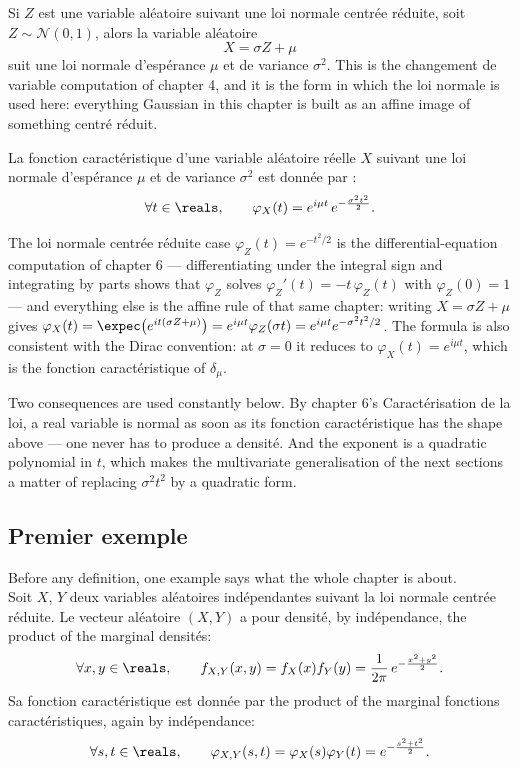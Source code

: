 Si $Z$ est une variable aléatoire suivant une loi normale centrée réduite, soit
$Z \sim \mathcal{N}(0,1)$, alors la variable aléatoire
\[
  X = \sigma Z + \mu
\]
suit une loi normale d'espérance $\mu$ et de variance $\sigma^{2}$. This
is the changement de variable computation of chapter 4, and it is the form in
which the loi normale is used here: everything Gaussian in this chapter is
built as an affine image of something centré réduit.

\begin{prop}
La fonction caractéristique d'une variable aléatoire réelle $X$ suivant une loi
normale d'espérance $\mu$ et de variance $\sigma^{2}$ est donnée par :
\[
  \forall t \in \reals, \qquad
  \varphi_{X}(t) = e^{i\mu t}\, e^{-\frac{\sigma^{2}t^{2}}{2}} .
\]
\end{prop}

\begin{remark}
The loi normale centrée réduite case $\varphi_{Z}(t) = e^{-t^{2}/2}$ is the
differential-equation computation of chapter 6 --- differentiating under the
integral sign and integrating by parts shows that $\varphi_{Z}$ solves
$\varphi_{Z}'(t) = -t\,\varphi_{Z}(t)$ with $\varphi_{Z}(0) = 1$ --- and
everything else is the affine rule of that same chapter: writing $X = \sigma Z + \mu$ gives
$\varphi_{X}(t) = \expec\!\left(e^{it(\sigma Z + \mu)}\right)
 = e^{i\mu t}\varphi_{Z}(\sigma t) = e^{i\mu t}e^{-\sigma^{2}t^{2}/2}$.
The formula is also consistent with the Dirac convention: at $\sigma = 0$ it
reduces to $\varphi_{X}(t) = e^{i\mu t}$, which is the fonction caractéristique
of $\delta_{\mu}$.
\end{remark}

Two consequences are used constantly below. By chapter 6's Caractérisation de la loi, a
real variable is normal as soon as its fonction caractéristique has the shape
above --- one never has to produce a densité. And the exponent is a quadratic
polynomial in $t$, which makes the multivariate generalisation of the next
sections a matter of replacing $\sigma^{2}t^{2}$ by a quadratic form.

\subsection{Premier exemple}

Before any definition, one example says what the whole chapter is about.\\

Soit $X$, $Y$ deux variables aléatoires indépendantes suivant la loi normale
centrée réduite. Le vecteur aléatoire $(X,Y)$ a pour densité, by indépendance,
the product of the marginal densités:
\[
  \forall x,y \in \reals, \qquad
  f_{X,Y}(x,y) = f_{X}(x) f_{Y}(y)
               = \frac{1}{2\pi}\, e^{-\frac{x^{2}+y^{2}}{2}} .
\]
Sa fonction caractéristique est donnée par the product of the marginal
fonctions caractéristiques, again by indépendance:
\[
  \forall s,t \in \reals, \qquad
  \varphi_{X,Y}(s,t) = \varphi_{X}(s)\varphi_{Y}(t)
                     = e^{-\frac{s^{2}+t^{2}}{2}} .
\]

